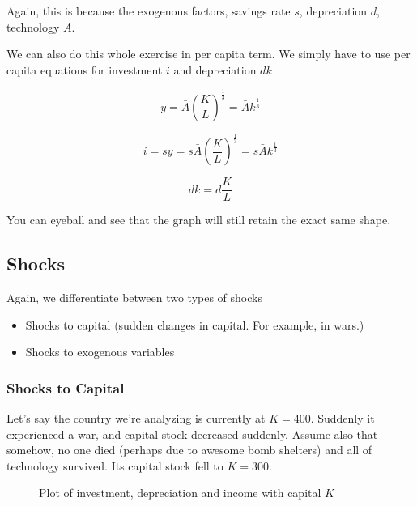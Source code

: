 \documentclass[11pt]{scrartcl}
\newcommand{\oneth}{\ensuremath{\frac{1}{3}}}
\begin{document}
Again, this is because the exogenous factors, savings rate $s$, depreciation $d$, technology $A$.

We can also do this whole exercise in per capita term. We simply have to use per capita equations for investment $i$ and depreciation $dk$

\[ y = \bar{A}\left(\frac{K}{L}\right)^\oneth = \bar{A}k^\oneth \]

\[ i = sy = s\bar{A}\left(\frac{K}{L}\right)^\oneth = s\bar{A}k^\oneth\]

\[ dk = d \frac{K}{L} \]

You can eyeball and see that the graph will still retain the exact same shape.

\subsection{Shocks}

Again, we differentiate between two types of shocks

\begin{itemize}
\item Shocks to capital (sudden changes in capital. For example, in wars.)
\item Shocks to exogenous variables
\end{itemize}

\subsubsection{Shocks to Capital}

Let's say the country we're analyzing is currently at $K = 400$. Suddenly it experienced a war, and capital stock decreased suddenly. Assume also that somehow, no one died (perhaps due to awesome bomb shelters) and all of technology survived. Its capital stock fell to $K=300$. 

\begin{figure}[ht!]
\centering
{}
\caption{Plot of investment, depreciation and income with capital $K$}
\end{figure}
\end{document}
